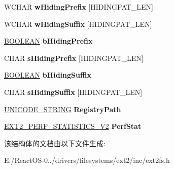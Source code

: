 \begin{DoxyCompactItemize}
\begin{tabbing}
\end{tabbing}\item 
\mbox{\label{struct___e_x_t2___g_l_o_b_a_l_ad73b2dc1ec09f3840eb21fe5cc279ab8}} 
W\+C\+H\+AR {\bfseries w\+Hiding\+Prefix} \mbox{[}H\+I\+D\+I\+N\+G\+P\+A\+T\+\_\+\+L\+EN\mbox{]}
\item 
\mbox{\label{struct___e_x_t2___g_l_o_b_a_l_a9dd2a43026c47e900e8016e7093ba7f5}} 
W\+C\+H\+AR {\bfseries w\+Hiding\+Suffix} \mbox{[}H\+I\+D\+I\+N\+G\+P\+A\+T\+\_\+\+L\+EN\mbox{]}
\item 
\mbox{\label{struct___e_x_t2___g_l_o_b_a_l_ae7591a8a344235889fc23072fd2f3e5c}} 
\hyperlink{_processor_bind_8h_a112e3146cb38b6ee95e64d85842e380a}{B\+O\+O\+L\+E\+AN} {\bfseries b\+Hiding\+Prefix}
\item 
\mbox{\label{struct___e_x_t2___g_l_o_b_a_l_aedb3407718d145124b3e710cc171e5fe}} 
C\+H\+AR {\bfseries s\+Hiding\+Prefix} \mbox{[}H\+I\+D\+I\+N\+G\+P\+A\+T\+\_\+\+L\+EN\mbox{]}
\item 
\mbox{\label{struct___e_x_t2___g_l_o_b_a_l_ab91f6efe762843f146085e990279ba9a}} 
\hyperlink{_processor_bind_8h_a112e3146cb38b6ee95e64d85842e380a}{B\+O\+O\+L\+E\+AN} {\bfseries b\+Hiding\+Suffix}
\item 
\mbox{\label{struct___e_x_t2___g_l_o_b_a_l_ab200338c43388ec5c13814a3e92ec0cd}} 
C\+H\+AR {\bfseries s\+Hiding\+Suffix} \mbox{[}H\+I\+D\+I\+N\+G\+P\+A\+T\+\_\+\+L\+EN\mbox{]}
\item 
\mbox{\label{struct___e_x_t2___g_l_o_b_a_l_a0ed055bceaae3e43c9d998a2f16f9e63}} 
\hyperlink{struct___u_n_i_c_o_d_e___s_t_r_i_n_g}{U\+N\+I\+C\+O\+D\+E\+\_\+\+S\+T\+R\+I\+NG} {\bfseries Registry\+Path}
\item 
\mbox{\label{struct___e_x_t2___g_l_o_b_a_l_aa3249e4f0481e7eaf14105f6d4c7f99b}} 
\hyperlink{struct___e_x_t2___p_e_r_f___s_t_a_t_i_s_t_i_c_s___v2}{E\+X\+T2\+\_\+\+P\+E\+R\+F\+\_\+\+S\+T\+A\+T\+I\+S\+T\+I\+C\+S\+\_\+\+V2} {\bfseries Perf\+Stat}
\end{DoxyCompactItemize}


该结构体的文档由以下文件生成\+:\begin{DoxyCompactItemize}
\item 
E\+:/\+React\+O\+S-\/0../drivers/filesystems/ext2/inc/ext2fs.\+h\end{DoxyCompactItemize}
